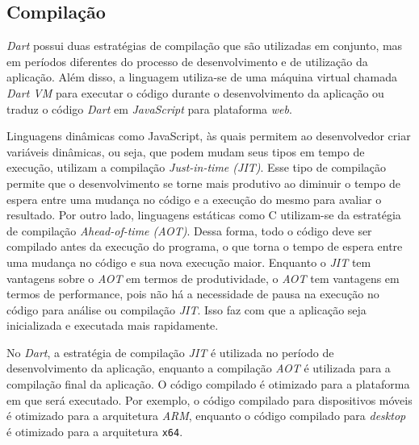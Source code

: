\subsection{Compilação}
\label{cap2:SubSec:Compilacao}
\textit{Dart} possui duas estratégias de compilação que são utilizadas em conjunto, mas em períodos diferentes do processo de desenvolvimento e de utilização da aplicação. Além disso, a linguagem utiliza-se de uma máquina virtual chamada \textit{Dart VM} para executar o código durante o desenvolvimento da aplicação ou traduz o código \textit{Dart} em \textit{JavaScript} para plataforma \textit{web}.

Linguagens dinâmicas como JavaScript, às quais permitem ao desenvolvedor criar variáveis dinâmicas, ou seja, que podem mudam seus tipos em tempo de execução, utilizam a compilação \textit{Just-in-time (JIT)}. Esse tipo de compilação permite que o desenvolvimento se torne mais produtivo ao diminuir o tempo de espera entre uma mudança no código e a execução do mesmo para avaliar o resultado. Por outro lado, linguagens estáticas como C utilizam-se da estratégia de compilação \textit{Ahead-of-time (AOT)}. Dessa forma, todo o código deve ser compilado antes da execução do programa, o que torna o tempo de espera entre uma mudança no código e sua nova execução maior. Enquanto o \textit{JIT} tem vantagens sobre o \textit{AOT} em termos de produtividade, o \textit{AOT} tem vantagens em termos de performance, pois não há a necessidade de pausa na execução no código para análise ou compilação \textit{JIT}. Isso faz com que a aplicação seja inicializada e executada mais rapidamente. 



No \textit{Dart}, a estratégia de compilação \textit{JIT} é utilizada no período de desenvolvimento da aplicação, enquanto a compilação \textit{AOT} é utilizada para a compilação final da aplicação. O código compilado é otimizado para a plataforma em que será executado. Por exemplo, o código compilado para dispositivos móveis é otimizado para a arquitetura \textit{ARM}, enquanto o código compilado para \textit{desktop} é otimizado para a arquitetura \texttt{x64}.

